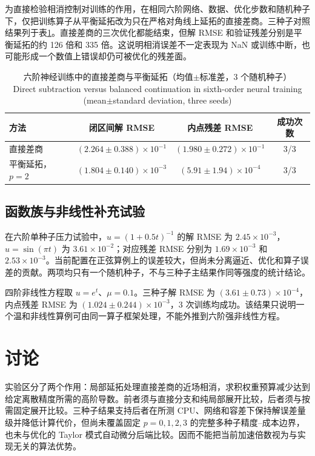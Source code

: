 \documentclass[UTF8,fontset=none,10.5pt,a4paper]{ctexart}
\numberwithin{equation}{section}
\begin{document}
为直接检验相消控制对训练的作用，在相同六阶网络、数据、优化步数和随机种子下，仅把训练算子从平衡延拓改为只在严格对角线上延拓的直接差商。三种子对照结果列于表\ref{tab:direct-neural}。直接差商的三次优化都能结束，但解 RMSE 和验证残差分别是平衡延拓的约 126 倍和 335 倍。这说明相消误差不一定表现为 NaN 或训练中断，也可能形成一个数值上错误却仍可被优化的残差面。

\begin{table}[H]
\centering
\caption{六阶神经训练中的直接差商与平衡延拓（均值$\pm$标准差，3 个随机种子）\\Direct subtraction versus balanced continuation in sixth-order neural training (mean$\pm$standard deviation, three seeds)}
\label{tab:direct-neural}
\small
\begin{tabular}{lccc}
\toprule
方法 & 闭区间解 RMSE & 内点残差 RMSE & 成功次数\\
\midrule
直接差商 & $(2.264\pm0.388)\times10^{-1}$ & $(1.980\pm0.272)\times10^{-1}$ & 3/3\\
平衡延拓，$p=2$ & $(1.804\pm0.140)\times10^{-3}$ & $(5.91\pm1.94)\times10^{-4}$ & 3/3\\
\bottomrule
\end{tabular}
\end{table}

\subsection{函数族与非线性补充试验}

在六阶单种子压力试验中，$u=(1+0.5t)^{-1}$ 的解 RMSE 为 $2.45\times10^{-3}$，$u=\sin(\pi t)$ 为 $3.61\times10^{-2}$；对应残差 RMSE 分别为 $1.69\times10^{-3}$ 和 $2.53\times10^{-3}$。当前配置在正弦算例上的误差较大，但尚未分离逼近、优化和算子误差的贡献。两项均只有一个随机种子，不与三种子主结果作同等强度的统计结论。

四阶非线性方程取 $u=e^t$、$\mu=0.1$。三种子解 RMSE 为 $(3.61\pm0.73)\times10^{-4}$，内点残差 RMSE 为 $(1.024\pm0.244)\times10^{-3}$，3 次训练均成功。该结果只说明一个温和非线性算例可由同一算子框架处理，不能外推到六阶强非线性方程。

\section{讨论}

实验区分了两个作用：局部延拓处理直接差商的近场相消，求积权重预算减少达到给定离散精度所需的高阶导数。前者须与直接分支和纯局部展开比较，后者须与按需固定展开比较。三种子结果支持后者在所测 CPU、网络和容差下保持解误差量级并降低计算代价，但尚未覆盖固定 $p=0,1,2,3$ 的完整多种子精度--成本边界，也未与优化的 Taylor 模式自动微分后端比较\cite{Dangel2025}。因而不能把当前加速倍数视为与实现无关的算法优势。
\end{document}
